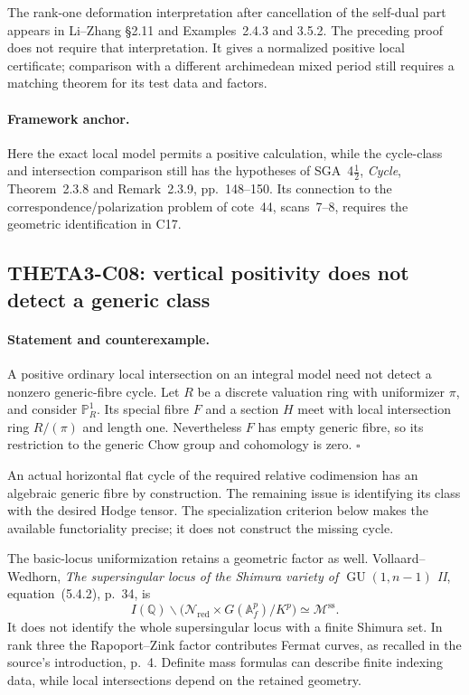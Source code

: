 \documentclass[11pt]{article}
\newcommand{\Q}{\mathbb Q}\newcommand{\C}{\mathbb C}\newcommand{\Z}{\mathbb Z}\newcommand{\R}{\mathbb R}\newcommand{\A}{\mathbb A}\newcommand{\OO}{\mathcal O}
\theoremstyle{definition}\newtheorem{definition}[theorem]{Definition}\newtheorem{remark}[theorem]{Remark}
\begin{document}
The rank-one deformation interpretation after cancellation of the
self-dual part appears in Li--Zhang \S2.11 and Examples~2.4.3 and
3.5.2. The preceding proof does not require that interpretation.
It gives a normalized positive local certificate; comparison with
a different archimedean mixed period still requires a matching
theorem for its test data and factors.

\paragraph{Framework anchor.}
Here the exact local model permits a positive calculation, while the
cycle-class and intersection comparison still has the hypotheses of
SGA~4$\frac12$, \emph{Cycle}, Theorem~2.3.8 and Remark~2.3.9,
pp.~148--150.  Its connection to the correspondence/polarization problem
of cote~44, scans~7--8, requires the geometric identification in C17.

\subsection{THETA3-C08: vertical positivity does not detect a generic class}\label{C08}

\paragraph{Statement and counterexample.}
A positive ordinary local intersection on an integral model need
not detect a nonzero generic-fibre cycle. Let $R$ be a discrete
valuation ring with uniformizer $\pi$, and consider $\mathbb P^1_R$.
Its special fibre $F$ and a section $H$ meet with local intersection
ring $R/(\pi)$ and length one. Nevertheless $F$ has empty generic
fibre, so its restriction to the generic Chow group and cohomology
is zero. $\square$

An actual horizontal flat cycle of the required relative
codimension has an algebraic generic fibre by construction. The
remaining issue is identifying its class with the desired Hodge
tensor. The specialization criterion below makes the available
functoriality precise; it does not construct the missing cycle.

The basic-locus uniformization retains a geometric factor as well.
Vollaard--Wedhorn, \emph{The supersingular locus of the Shimura
variety of $\operatorname{GU}(1,n-1)$ II}, equation~(5.4.2), p.~34,
is
\[
 I(\Q)\backslash
 \bigl(\mathcal N_{\mathrm{red}}\times G(\mathbb A_f^p)/K^p\bigr)
 \simeq \mathcal M^{\mathrm{ss}}.
\]
It does not identify the whole supersingular locus with a finite
Shimura set. In rank three the Rapoport--Zink factor contributes
Fermat curves, as recalled in the source's introduction, p.~4.
Definite mass formulas can describe finite indexing data, while
local intersections depend on the retained geometry.
\end{document}
